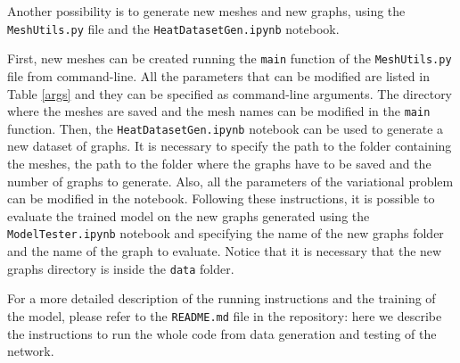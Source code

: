 \documentclass[11pt,a4paper]{article}
\begin{document}
Another possibility is to generate new meshes and new graphs, using the \texttt{MeshUtils.py} file and the \texttt{HeatDatasetGen.ipynb} notebook.

First, new meshes can be created running the \texttt{main} function of the \texttt{MeshUtils.py} file from command-line. All the parameters that can be modified are listed in Table \ref{args} and they can be specified as command-line arguments. The directory where the meshes are saved and the mesh names can be modified in the \texttt{main} function. 
Then, the \texttt{HeatDatasetGen.ipynb} notebook can be used to generate a new dataset of graphs. It is necessary to specify the path to the folder containing the meshes, the path to the folder where the graphs have to be saved and the number of graphs to generate. Also, all the parameters of the variational problem can be modified in the notebook.
Following these instructions, it is possible to evaluate the trained model on the new graphs generated using the \texttt{ModelTester.ipynb} notebook and specifying the name of the new graphs folder and the name of the graph to evaluate. Notice that it is necessary that the new graphs directory is inside the \texttt{data} folder.

For a more detailed description of the running instructions and the training of the model, please refer to the \texttt{README.md} file in the repository: here we describe the instructions to run the whole code from data generation and testing of the network.

\end{document}
